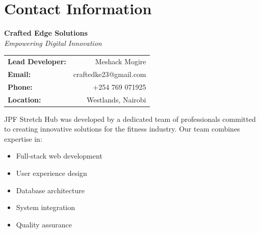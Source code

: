 \chapter{Contact Information}

\begin{tcolorbox}[
    enhanced,
    title={Development Team},
    attach boxed title to top left,
    boxed title style={
        colback=primary!50,
        colframe=primary!50,
        arc=0mm,
    },
    colback=white,
    colframe=primary!50,
    arc=0mm,
    fonttitle=\bfseries
]
    \begin{center}
        \textbf{Crafted Edge Solutions}\\
        \vspace{0.2cm}
        \textit{Empowering Digital Innovation}\\
        \vspace{0.3cm}
        \begin{tabular}{lr}
            \textbf{Lead Developer:} & Meshack Mogire \\
            \textbf{Email:} & craftedke23@gmail.com \\
            \textbf{Phone:} & +254 769 071925 \\
            \textbf{Location:} & Westlands, Nairobi \\
        \end{tabular}
    \end{center}
    
    \vspace{0.3cm}
    JPF Stretch Hub was developed by a dedicated team of professionals committed to creating innovative solutions for the fitness industry. Our team combines expertise in:
    \begin{itemize}[nosep]
        \item Full-stack web development
        \item User experience design
        \item Database architecture
        \item System integration
        \item Quality assurance
    \end{itemize}
\end{tcolorbox}

